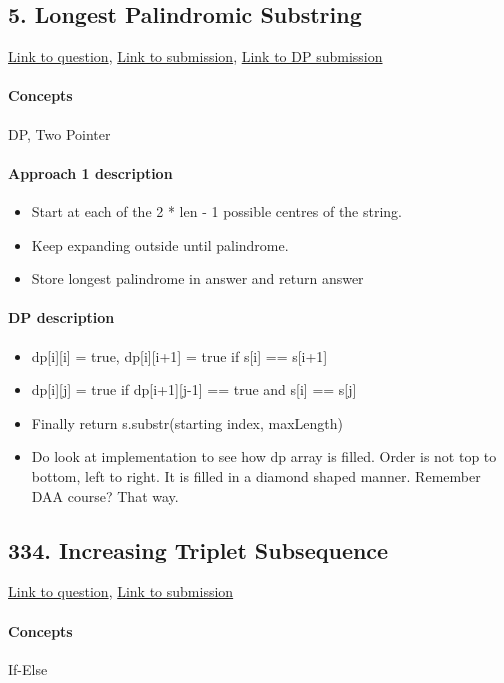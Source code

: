 \documentclass[11pt]{book}
\begin{document}
\subsection{5. Longest Palindromic Substring}
\href{https://leetcode.com/problems/longest-palindromic-substring/}{Link to question},
\href{https://leetcode.com/submissions/detail/337683777/}{Link to submission},
\href{https://leetcode.com/submissions/detail/337711978/}{Link to DP submission}
\paragraph{Concepts}
DP, Two Pointer
\paragraph{Approach 1 description}
\begin{itemize}
    \item Start at each of the 2 * len - 1 possible centres of the string.
    \item Keep expanding outside until palindrome.
    \item Store longest palindrome in answer and return answer
\end{itemize}
\paragraph{DP description}
\begin{itemize}
    \item dp[i][i] = true, dp[i][i+1] = true if s[i] == s[i+1]
    \item dp[i][j] = true if dp[i+1][j-1] == true and s[i] == s[j]
    \item Finally return s.substr(starting index, maxLength)
    \item Do look at implementation to see how dp array is filled. Order is not top to bottom, left to right. It is filled in a diamond shaped manner. Remember DAA course? That way.
\end{itemize}

\subsection{334. Increasing Triplet Subsequence}
\href{https://leetcode.com/problems/increasing-triplet-subsequence/}{Link to question},
\href{https://leetcode.com/submissions/detail/328930482/}{Link to submission}
\paragraph{Concepts}
If-Else
\end{document}
